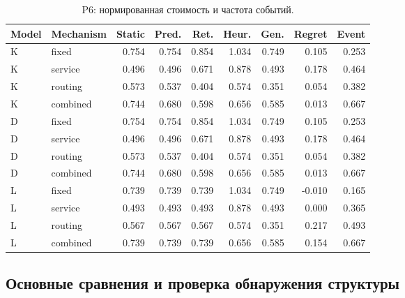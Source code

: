 \begin{table}[htbp]\caption{P6: нормированная стоимость и частота событий.}\centering\small\setlength{\tabcolsep}{3pt}

\begin{tabular}{llrrrrrrr}\toprule

Model & Mechanism & Static & Pred. & Ret. & Heur. & Gen. & Regret & Event\\\midrule

K & fixed & 0.754 & 0.754 & 0.854 & 1.034 & 0.749 & 0.105 & 0.253\\

K & service & 0.496 & 0.496 & 0.671 & 0.878 & 0.493 & 0.178 & 0.464\\

K & routing & 0.573 & 0.537 & 0.404 & 0.574 & 0.351 & 0.054 & 0.382\\

K & combined & 0.744 & 0.680 & 0.598 & 0.656 & 0.585 & 0.013 & 0.667\\

D & fixed & 0.754 & 0.754 & 0.854 & 1.034 & 0.749 & 0.105 & 0.253\\

D & service & 0.496 & 0.496 & 0.671 & 0.878 & 0.493 & 0.178 & 0.464\\

D & routing & 0.573 & 0.537 & 0.404 & 0.574 & 0.351 & 0.054 & 0.382\\

D & combined & 0.744 & 0.680 & 0.598 & 0.656 & 0.585 & 0.013 & 0.667\\

L & fixed & 0.739 & 0.739 & 0.739 & 1.034 & 0.749 & -0.010 & 0.165\\

L & service & 0.493 & 0.493 & 0.493 & 0.878 & 0.493 & 0.000 & 0.365\\

L & routing & 0.567 & 0.567 & 0.567 & 0.574 & 0.351 & 0.217 & 0.493\\

L & combined & 0.739 & 0.739 & 0.739 & 0.656 & 0.585 & 0.154 & 0.667\\

\bottomrule\end{tabular}\end{table}

\clearpage

\subsection{Основные сравнения и проверка обнаружения структуры}

